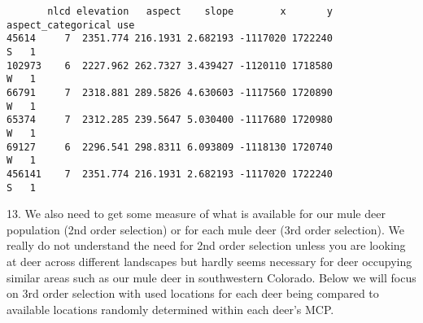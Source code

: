 \documentclass[
  letterpaper,
]{book}
\newenvironment{Shaded}{\begin{snugshade}}{\end{snugshade}}
\newcommand{\CommentTok}[1]{\textcolor[rgb]{0.37,0.37,0.37}{#1}}
\newcommand{\DecValTok}[1]{\textcolor[rgb]{0.68,0.00,0.00}{#1}}
\newcommand{\DocumentationTok}[1]{\textcolor[rgb]{0.37,0.37,0.37}{\textit{#1}}}
\newcommand{\FunctionTok}[1]{\textcolor[rgb]{0.28,0.35,0.67}{#1}}
\newcommand{\NormalTok}[1]{\textcolor[rgb]{0.00,0.23,0.31}{#1}}
\newcommand{\OtherTok}[1]{\textcolor[rgb]{0.00,0.23,0.31}{#1}}
\newcommand{\SpecialCharTok}[1]{\textcolor[rgb]{0.37,0.37,0.37}{#1}}
\begin{document}
\begin{Shaded}
\end{Shaded}

\begin{verbatim}
       nlcd elevation   aspect    slope        x       y aspect_categorical use
45614     7  2351.774 216.1931 2.682193 -1117020 1722240                  S   1
102973    6  2227.962 262.7327 3.439427 -1120110 1718580                  W   1
66791     7  2318.881 289.5826 4.630603 -1117560 1720890                  W   1
65374     7  2312.285 239.5647 5.030400 -1117680 1720980                  W   1
69127     6  2296.541 298.8311 6.093809 -1118130 1720740                  W   1
456141    7  2351.774 216.1931 2.682193 -1117020 1722240                  S   1
\end{verbatim}

13. We also need to get some measure of what is available for our mule
deer population (2nd order selection) or for each mule deer (3rd order
selection). We really do not understand the need for 2nd order selection
unless you are looking at deer across different landscapes but hardly
seems necessary for deer occupying similar areas such as our mule deer
in southwestern Colorado. Below we will focus on 3rd order selection
with used locations for each deer being compared to available locations
randomly determined within each deer's MCP.
\end{document}
